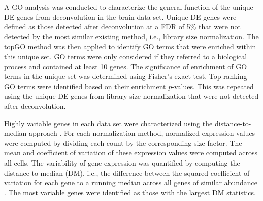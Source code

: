 \documentclass{bmcart}
\newcommand{\revised}[1]{#1}
\begin{document}

A GO analysis was conducted to characterize the general function of the unique DE genes from deconvolution in the brain data set.
Unique DE genes were defined as those detected after deconvolution at a FDR of 5\% that were not detected by the most similar existing method, i.e., library size normalization.
The topGO method \cite{alexa2010topgo} was then applied to identify GO terms that were enriched within this unique set.
GO terms were only considered if they referred to a biological process and contained at least 10 genes.
The significance of enrichment of GO terms in the unique set was determined using Fisher's exact test.
Top-ranking GO terms were identified based on their enrichment $p$-values.
This was repeated using the unique DE genes from library size normalization that were not detected after deconvolution.

Highly variable genes in each data set were characterized using the distance-to-median approach \cite{kolod2015single}.
For each normalization method, normalized expression values were computed by dividing each count by the corresponding size factor.
The mean and coefficient of variation of these expression values were computed across all cells.
The variability of gene expression was quantified by computing the distance-to-median (DM), i.e., the difference between the squared coefficient of variation for each gene to a running median across all genes \revised{of} similar abundance \cite{kolod2015single}. 
The most variable genes were identified as those with the largest DM statistics.

\end{document}
